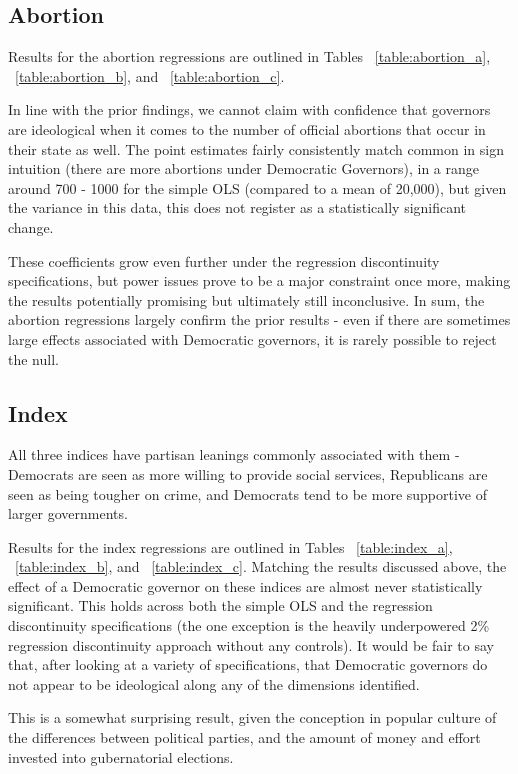 \documentclass{article}
\begin{document}
\subsection{Abortion}

Results for the abortion regressions are outlined in Tables ~\ref{table:abortion_a}, ~\ref{table:abortion_b}, and ~\ref{table:abortion_c}.

In line with the prior findings, we cannot claim with confidence that governors are ideological when it comes to the number of official abortions that occur in their state as well. The point estimates fairly consistently match common in sign intuition (there are more abortions under Democratic Governors), in a range around 700 - 1000 for the simple OLS (compared to a mean of 20,000), but given the variance in this data, this does not register as a statistically significant change.

These coefficients grow even further under the regression discontinuity specifications, but power issues prove to be a major constraint once more, making the results potentially promising but ultimately still inconclusive. In sum, the abortion regressions largely confirm the prior results - even if there are sometimes large effects associated with Democratic governors, it is rarely possible to reject the null. 
 
\subsection{Index}

All three indices have partisan leanings commonly associated with them - Democrats are seen as more willing to provide social services, Republicans are seen as being tougher on crime, and Democrats tend to be more supportive of larger governments. 

Results for the index regressions are outlined in Tables ~\ref{table:index_a}, ~\ref{table:index_b}, and ~\ref{table:index_c}. Matching the results discussed above, the effect of a Democratic governor on these indices are almost never statistically significant. This holds across both the simple OLS and the regression discontinuity specifications (the one exception is the heavily underpowered 2\% regression discontinuity approach without any controls). It would be fair to say that, after looking at a variety of specifications, that Democratic governors do not appear to be ideological along any of the dimensions identified. 

This is a somewhat surprising result, given the conception in popular culture of the differences between political parties, and the amount  of money and effort invested into gubernatorial elections.\\\\
\end{document}
